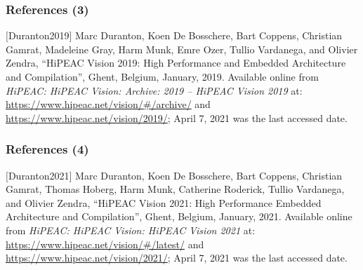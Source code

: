 \begin{frame}
	\frametitle{References (3)}

	$[$Duranton2019$]$ Marc Duranton, Koen {De Bosschere}, Bart Coppens, Christian Gamrat, Madeleine Gray, Harm Munk, Emre Ozer, Tullio Vardanega, and Olivier Zendra, ``{HiPEAC} Vision 2019: High Performance and Embedded Architecture and Compilation'', Ghent, Belgium, January, 2019. Available online from {\it {HiPEAC}: {HiPEAC} Vision: Archive: 2019 -- {HiPEAC} Vision 2019} at: \url{https://www.hipeac.net/vision/\#/archive/} and \url{https://www.hipeac.net/vision/2019/}; April 7, 2021 was the last accessed date. \\



\end{frame}








\begin{frame}
	\frametitle{References (4)}

	$[$Duranton2021$]$ Marc Duranton, Koen {De Bosschere}, Bart Coppens, Christian Gamrat, Thomas Hoberg, Harm Munk, Catherine Roderick, Tullio Vardanega, and Olivier Zendra, ``{HiPEAC} Vision 2021: High Performance Embedded Architecture and Compilation'', Ghent, Belgium, January, 2021. Available online from {\it {HiPEAC}: {HiPEAC} Vision: {HiPEAC} Vision 2021} at: \url{https://www.hipeac.net/vision/\#/latest/} and \url{https://www.hipeac.net/vision/2021/}; April 7, 2021 was the last accessed date. \\



\end{frame}





